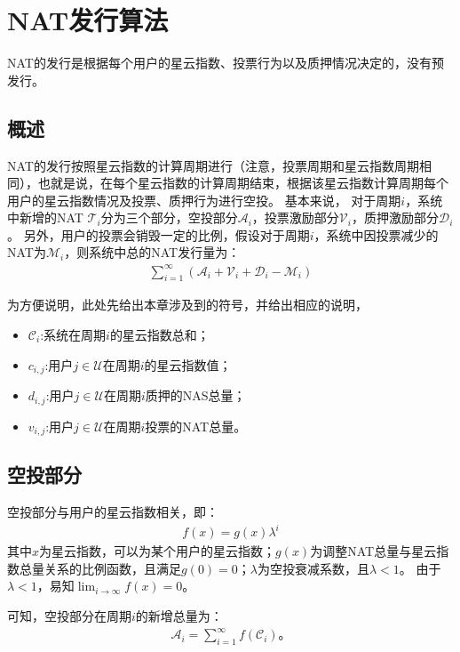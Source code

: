
\section{NAT发行算法}

NAT的发行是根据每个用户的星云指数、投票行为以及质押情况决定的，没有预发行。

\subsection{概述}
NAT的发行按照星云指数的计算周期进行（注意，投票周期和星云指数周期相同），也就是说，在每个星云指数的计算周期结束，根据该星云指数计算周期每个用户的星云指数情况及投票、质押行为进行空投。
基本来说，
对于周期$i$，系统中新增的NAT $\mathcal{T}_i$分为三个部分，空投部分$\mathcal{A}_i$，投票激励部分$\mathcal{V}_i$，质押激励部分$\mathcal{D}_i$。
另外，用户的投票会销毁一定的比例，假设对于周期$i$，系统中因投票减少的NAT为$\mathcal{M}_i$，则系统中总的NAT发行量为：
\begin{align}
\sum_{i=1}^{\infty} (\mathcal{A}_i + \mathcal{V}_i + \mathcal{D}_i - \mathcal{M}_i)
\end{align}

为方便说明，此处先给出本章涉及到的符号，并给出相应的说明，
\begin{itemize}
\item $\mathcal{C}_i$:系统在周期$i$的星云指数总和；
\item $c_{i,j}$:用户$j \in \mathcal{U}$在周期$i$的星云指数值；
\item $d_{i,j}$:用户$j \in \mathcal{U}$在周期$i$质押的NAS总量；
\item $v_{i,j}$:用户$j \in \mathcal{U}$在周期$i$投票的NAT总量。
\end{itemize}

\subsection{空投部分}
空投部分与用户的星云指数相关，即：
\begin{align}
    f(x) = g(x)\lambda^i
\end{align}
\noindent 其中$x$为星云指数，可以为某个用户的星云指数；$g(x)$为调整NAT总量与星云指数总量关系的比例函数，且满足$g(0) = 0$；$\lambda$为空投衰减系数，且$\lambda < 1$。
由于$\lambda < 1$，易知$\lim_{i\to \infty}f(x) = 0$。

可知，空投部分在周期$i$的新增总量为：
\begin{align}
\mathcal{A}_i = \sum_{i=1}^{\infty}f(\mathcal{C}_i)。
\end{align}

